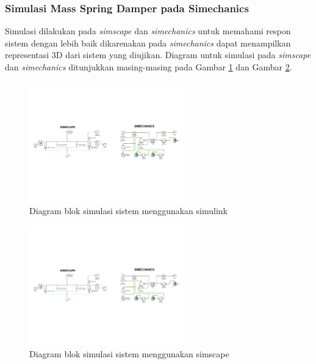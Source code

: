 \documentclass[../main.tex]{subfiles}
\begin{document}
            \subsubsection{Simulasi Mass Spring Damper pada Simechanics}
                Simulasi dilakukan pada \textit{simscape} dan \textit{simechanics} untuk memahami respon sistem dengan lebih baik dikarenakan pada \textit{simechanics} dapat menampilkan representasi 3D dari sistem yang diujikan. Diagram untuk simulasi pada \textit{simscape} dan \textit{simechanics} ditunjukkan masing-masing pada Gambar \ref{simulasi_simulink} dan Gambar \ref{simulasi_simscape}.
                \begin{figure}[H]
                    \centering
                    \includegraphics[width = 0.6\textwidth]{assets/image/mass_spring_damper_simulink.pdf}
                    \caption{Diagram blok simulasi sistem menggunakan simulink}
                    \label{simulasi_simulink}
                \end{figure}
                \begin{figure}[H]
                    \centering
                    \includegraphics[width = 0.6\textwidth]{assets/image/mass_spring_damper_simscape.pdf}
                    \caption{Diagram blok simulasi sistem menggunakan simscape}
                    \label{simulasi_simscape}
                \end{figure}
\end{document}
